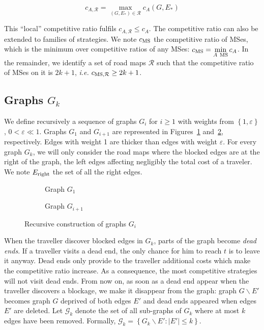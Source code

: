 \documentclass[11pt,letterpaper]{article}
\newcommand{\set}[1]{\left\{ #1 \right\}}
\newcommand{\card}[1]{\left| #1 \right|}
\newcommand{\mcalg}{\mathcal{G}}
\newcommand{\mts}{MS}
\newcommand{\cms}{c_{\mbox{\scriptsize{MS}}}}
\newcommand{\cmsr}{c_{\mbox{\scriptsize{MS}}, \mathcal{R}}}
\begin{document}
\begin{equation}
c_{A,\mathcal{R}} = \max\limits_{\left(G,E_*\right) \in \mathcal{R}} c_A\left(G,E_*\right)
\end{equation}

This ``local'' competitive ratio fulfils $c_{A,\mathcal{R}} \le c_A$. The competitive ratio can also be extended to families of strategies. We note $\cms$ the competitive ratio of \mts es, which is the minimum over competitive ratios of any \mts es: $\cms = \min\limits_{A ~\mbox{\scriptsize{\mts}}} c_A$. In the remainder, we identify a set of road maps $\mathcal{R}$ such that the competitive ratio of \mts es on it is $2k+1$, {\em i.e.} $\cmsr \ge 2k+1$.
\subsection{Graphs $G_k$}

We define recursively a sequence of graphs $G_i$ for $i \geq 1$ with weights from $\set{1,\varepsilon}$, $0 < \varepsilon \ll 1$. Graphs $G_1$ and $G_{i+1}$ are represented in Figures~\ref{subfig:G_1} and~\ref{subfig:G_i}, respectively. Edges with weight 1 are thicker than edges with weight $\varepsilon$. For every graph $G_k$, we will only consider the road maps where the blocked edges are at the right of the graph, the left edges affecting negligibly the total cost of a traveler. We note $E_{\mbox{\scriptsize{right}}}$ the set of all the right edges.

\begin{figure}[h]
\centering
\begin{subfigure}[b]{0.49\columnwidth}
\centering

\caption{Graph $G_1$}
\label{subfig:G_1}
\end{subfigure}
\begin{subfigure}[b]{0.49\columnwidth}
\centering
\scalebox{.76}{}
\caption{Graph $G_{i+1}$}
\label{subfig:G_i}
\end{subfigure}
\caption{Recursive construction of graphs $G_i$}
\label{fig:G_i}
\end{figure}

When the traveller discover blocked edges in $G_k$, parts of the graph become \textit{dead ends}. If a traveller visits a dead end, the only chance for him to reach $t$ is to leave it anyway. Dead ends only provide to the traveller additional costs which make the competitive ratio increase. As a consequence, the most competitive strategies will not visit dead ends. From now on, as soon as a dead end appear when the traveller discovers a blockage, we make it disappear from the graph: graph $G\backslash E'$ becomes graph $G$ deprived of both edges $E'$ and dead ends appeared when edges $E'$ are deleted. Let $\mcalg_k$ denote the set of all sub-graphs of $G_k$ where at most $k$ edges have been removed. Formally, $\mcalg_k = \set{G_k\backslash E' : \card{E'} \leq k}$. 
\end{document}
